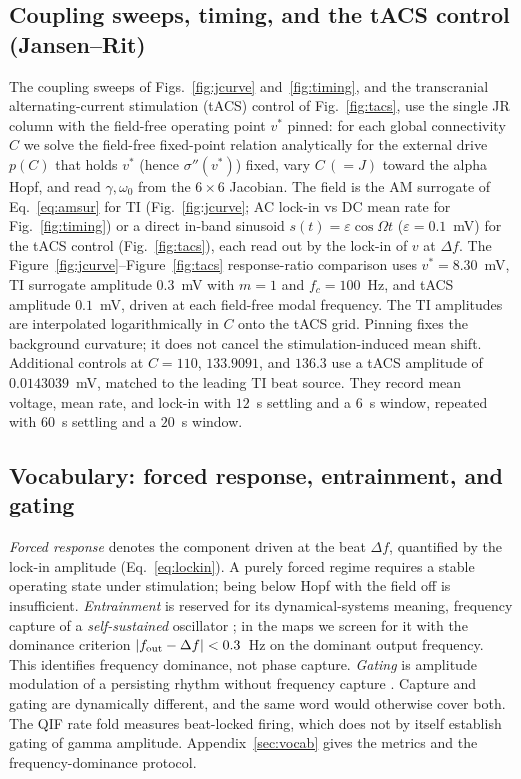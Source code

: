 \documentclass[11pt,a4paper]{article}
\newcommand{\Sig}{\sigma}
\providecommand{\DIFaddtex}[1]{{\protect\color{blue} \sf #1}} %
\providecommand{\DIFaddbegin}{} %
\providecommand{\DIFaddend}{} %
\providecommand{\DIFadd}[1]{\texorpdfstring{\DIFaddtex{#1}}{#1}} %
\begin{document}
\subsection{Coupling sweeps, timing, and the tACS control (Jansen--Rit)}
The coupling sweeps of Figs.~\ref{fig:jcurve} and~\ref{fig:timing}, and the transcranial
alternating-current stimulation (tACS) control of Fig.~\ref{fig:tacs}, use the single JR
column with the \DIFaddbegin \DIFadd{field-free }\DIFaddend operating point $v^*$ pinned: for
each global connectivity $C$ we solve the field-free fixed-point relation analytically
for the external drive $p(C)$ that holds $v^*$ (hence $\Sig''(v^*)$) fixed, vary $C\,(=J)$
toward the alpha Hopf, and read $\gamma,\omega_0$ from the $6\times6$ Jacobian. The field
is the AM surrogate of Eq.~\eqref{eq:amsur} for TI (Fig.~\ref{fig:jcurve}; AC lock-in vs DC mean
rate for Fig.~\ref{fig:timing}) or a direct in-band sinusoid $s(t)=\varepsilon\cos\Omega t$
($\varepsilon=0.1$~mV) for the tACS control (Fig.~\ref{fig:tacs}), each read out by the
lock-in of $v$ at $\Delta f$.
\DIFaddbegin \DIFadd{The Figure~\ref{fig:jcurve}--Figure~\ref{fig:tacs} response-ratio comparison uses
$v^*=8.30$~mV, TI surrogate amplitude $0.3$~mV with $m=1$ and $f_c=100$~Hz,
and tACS amplitude $0.1$~mV, driven at each field-free modal frequency.
The TI amplitudes are interpolated logarithmically in $C$ onto the tACS grid.
Pinning fixes the background curvature; it does not cancel the stimulation-induced
mean shift.
Additional controls at $C=110$, $133.9091$, and $136.3$ use a tACS amplitude of
$0.0143039$~mV, matched to the leading TI beat source. They record mean voltage,
mean rate, and lock-in with $12$~s settling and a $6$~s window, repeated with
$60$~s settling and a $20$~s window.
}\DIFaddend

\subsection{Vocabulary: forced response, entrainment, and gating}
\emph{Forced response} denotes the component driven at the beat $\Delta f$,
quantified by the lock-in amplitude (Eq.~\eqref{eq:lockin}). A purely forced regime
requires a stable operating state under stimulation; being below Hopf with the field
off is insufficient. \emph{Entrainment} is reserved for its
dynamical-systems meaning, frequency capture of a \emph{self-sustained} oscillator
\cite{pikovsky2001}; in the maps we screen for it with the dominance criterion
$|f_{\rm out}-\Delta f|<0.3$~Hz on the dominant output frequency. This identifies
frequency dominance, not phase capture. \emph{Gating} is amplitude modulation of a persisting rhythm without
frequency capture \cite{canolty2010,tort2010}. Capture and gating are dynamically different, and the same word would otherwise cover
both. The QIF rate fold measures beat-locked firing, which does not by itself
establish gating of gamma amplitude. Appendix~\ref{sec:vocab} gives the metrics
and the frequency-dominance protocol.
\end{document}
